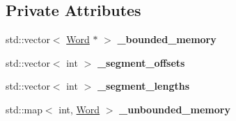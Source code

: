 \subsection*{Private Attributes}
\begin{DoxyCompactItemize}
\item 
\hypertarget{classMemory_a261c779e202d16009dd48c68291266f9}{
std::vector$<$ \hyperlink{classWord}{Word} $\ast$ $>$ {\bfseries \_\-bounded\_\-memory}}
\label{classMemory_a261c779e202d16009dd48c68291266f9}

\item 
\hypertarget{classMemory_adceb29287c4850dc78b4a66cc0890d47}{
std::vector$<$ int $>$ {\bfseries \_\-segment\_\-offsets}}
\label{classMemory_adceb29287c4850dc78b4a66cc0890d47}

\item 
\hypertarget{classMemory_a8a5f79ee8ee270287a668383ec8f4a6d}{
std::vector$<$ int $>$ {\bfseries \_\-segment\_\-lengths}}
\label{classMemory_a8a5f79ee8ee270287a668383ec8f4a6d}

\item 
\hypertarget{classMemory_a390295664efe18aa33298ead1004c442}{
std::map$<$ int, \hyperlink{classWord}{Word} $>$ {\bfseries \_\-unbounded\_\-memory}}
\label{classMemory_a390295664efe18aa33298ead1004c442}

\end{DoxyCompactItemize}
